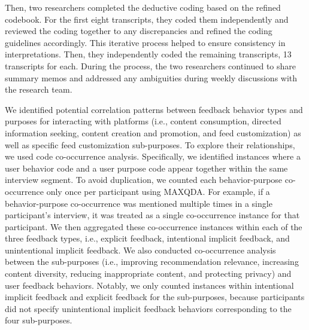 Then, two researchers completed the deductive coding based on the refined codebook. For the first eight transcripts, they coded them independently and reviewed the coding together to any discrepancies and refined the coding guidelines accordingly. This iterative process helped to ensure consistency in interpretations. Then, they independently coded the remaining transcripts, 13 transcripts for each. During the process, the two researchers continued to share summary memos and addressed any ambiguities during weekly discussions with the research team.

We identified potential correlation patterns between feedback behavior types and purposes for interacting with platforms (i.e., content consumption, directed information seeking, content creation and promotion, and feed customization) as well as specific feed customization sub-purposes. To explore their relationships, we used code co-occurrence analysis. Specifically, we identified instances where a user behavior code and a user purpose code appear together within the same interview segment. To avoid duplication, we counted each behavior-purpose co-occurrence only once per participant using MAXQDA. For example, if a behavior-purpose co-occurrence was mentioned multiple times in a single participant’s interview, it was treated as a single co-occurrence instance for that participant.  %
We then aggregated these co-occurrence instances within each of the three feedback types, i.e., explicit feedback, intentional implicit feedback, and unintentional implicit feedback. 
We also conducted co-occurrence analysis between the sub-purposes (i.e., improving recommendation relevance, increasing content diversity, reducing inappropriate content, and protecting privacy) and user feedback behaviors. Notably, we only counted instances within intentional implicit feedback and explicit feedback for the sub-purposes, because participants did not specify unintentional implicit feedback behaviors corresponding to the four sub-purposes. 
